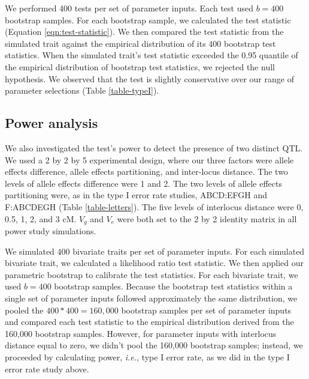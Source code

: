 \documentclass[12pt,twoside, lineno]{gsajnl}
\begin{document}
We performed 400 tests per set of parameter inputs. Each test used $b
= 400$ bootstrap samples. For each bootstrap sample, we calculated the
test statistic (Equation \ref{eqn:test-statistic}). We then compared
the test statistic from the simulated trait against the empirical
distribution of its 400 bootstrap test statistics. When the simulated
trait's test statistic exceeded the 0.95 quantile of the empirical
distribution of bootstrap test statistics, we rejected the null
hypothesis. We observed that the test is slightly conservative over
our range of parameter selections (Table \ref{table-typeI}).


\subsection{Power analysis}

We also investigated the test's power to detect the presence of two
distinct QTL. We used a 2 by 2 by 5 experimental design, where our
three factors were allele effects difference, allele effects
partitioning, and inter-locus distance. The two levels of allele
effects difference were 1 and 2. The two levels of allele effects
partitioning were, as in the type I error rate studies, ABCD:EFGH and
F:ABCDEGH (Table \ref{table-letters}). The five levels of interlocus
distance were 0, 0.5, 1, 2, and 3 cM. $V_g$ and $V_e$ were both set to
the 2 by 2 identity matrix in all power study simulations.

We simulated 400 bivariate traits per set of parameter inputs. For
each simulated bivariate trait, we calculated a likelihood ratio test
statistic. We then applied our parametric bootstrap to calibrate the
test statistics. For each bivariate trait, we used $b = 400$ bootstrap
samples. Because the bootstrap test statistics within a single set of
parameter inputs followed approximately the same distribution, we
pooled the $400 * 400 = 160,000$ bootstrap samples per set of
parameter inputs and compared each test statistic to the empirical
distribution derived from the 160,000 bootstrap samples. However, for
parameter inputs with interlocus distance equal to zero, we didn't
pool the 160,000 bootstrap samples; instead, we proceeded by
calculating power, \textit{i.e.}, type I error rate, as we did in the
type I error rate study above.
\end{document}
